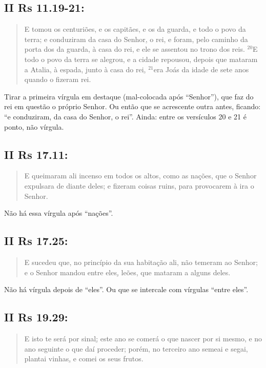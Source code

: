 \subsection*{II Rs 11.19-21:} 
\begin{quote}
    \small
E tomou os centuriões, e os capitães, e os da guarda, e todo o povo da terra; e conduziram da casa do Senhor\uline{,} o rei, e foram, pelo caminho da porta dos da guarda, à casa do rei, e ele se assentou no trono dos reis. $^{\mathrm{20}}$E todo o povo da terra se alegrou, e a cidade repousou, depois que mataram a Atalia, à espada, junto à casa do rei\uline{,} $^{\mathrm{21}}$era Joás da idade de sete anos quando o fizeram rei.
\end{quote}

Tirar a primeira vírgula em destaque (mal-colocada após ``Senhor''), que faz do rei em questão o próprio Senhor. Ou então que se acrescente outra antes, ficando: ``e conduziram, da casa do Senhor, o rei''. Ainda: entre os versículos 20 e 21 é ponto, não vírgula.

\subsection*{II Rs 17.11:} 
\begin{quote}
    \small
E queimaram ali incenso em todos os altos, como as nações\uline{,} que o Senhor expulsara de diante deles; e fizeram coisas ruins, para provocarem à ira o Senhor.
\end{quote}

Não há essa vírgula após ``nações''.

\subsection*{II Rs 17.25:} 
\begin{quote}
    \small
E sucedeu que, no princípio da sua habitação ali, não temeram ao Senhor; e o Senhor mandou entre eles\uline{,} leões, que mataram a alguns deles.
\end{quote}

Não há vírgula depois de ``eles''. Ou que se intercale com vírgulas
``entre eles''.

\subsection*{II Rs 19.29:} 
\begin{quote}
    \small
E isto te será por sinal\uline{;} este ano se comerá o que nascer por si mesmo, e no ano seguinte o que daí proceder; porém, no terceiro ano semeai e segai, plantai vinhas\uline{,} e comei os seus frutos.
\end{quote}

